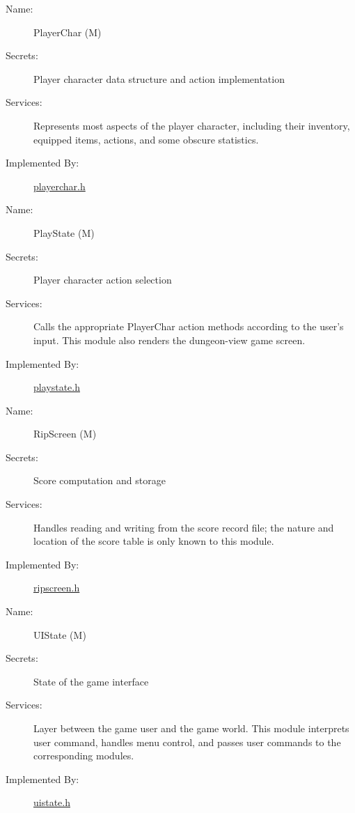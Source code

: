 \documentclass[12pt, titlepage]{article}
\newcounter{mnum}
\newcommand{\mdprint}[1]{\addtocounter{mnum}{1} #1 (M\themnum)}
\begin{document}
        \bigskip\begin{description}
            \item[Name:]\mdprint{PlayerChar}
            \item[Secrets:]Player character data structure and action implementation
            \item[Services:]Represents most aspects of the player character, including their inventory, equipped items, actions, and some obscure statistics.
            \item[Implemented By:]\href{run:../../../src/include/playerchar.h}{playerchar.h}
        \end{description}

        \bigskip\begin{description}
            \item[Name:]\mdprint{PlayState}
            \item[Secrets:]Player character action selection
            \item[Services:]Calls the appropriate PlayerChar action methods according to the user's input.  This module also renders the dungeon-view game screen.
            \item[Implemented By:]\href{run:../../../src/include/playstate.h}{playstate.h}
        \end{description}

        \bigskip\begin{description}
            \item[Name:]\mdprint{RipScreen}
            \item[Secrets:]Score computation and storage
            \item[Services:]Handles reading and writing from the score record file; the nature and location of the score table is only known to this module.
            \item[Implemented By:]\href{run:../../../src/include/ripscreen.h}{ripscreen.h}
        \end{description}

        \bigskip\begin{description}
            \item[Name:]\mdprint{UIState}
            \item[Secrets:]State of the game interface
            \item[Services:]Layer between the game user and the game world.   This module interprets user command, handles menu control, and passes user commands to the corresponding modules.
            \item[Implemented By:]\href{run:../../../src/include/uistate.h}{uistate.h}
        \end{description}
\end{document}
